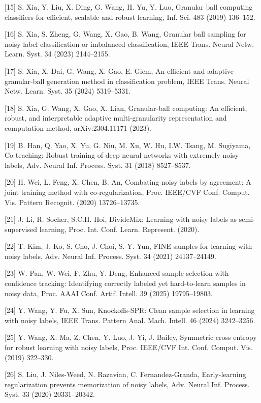 {[}15{]} S. Xia, Y. Liu, X. Ding, G. Wang, H. Yu, Y. Luo, Granular ball computing classifiers for efficient, scalable and robust learning, Inf. Sci. 483 (2019) 136--152.

{[}16{]} S. Xia, S. Zheng, G. Wang, X. Gao, B. Wang, Granular ball sampling for noisy label classification or imbalanced classification, IEEE Trans. Neural Netw. Learn. Syst. 34 (2023) 2144--2155.

{[}17{]} S. Xia, X. Dai, G. Wang, X. Gao, E. Giem, An efficient and adaptive granular-ball generation method in classification problem, IEEE Trans. Neural Netw. Learn. Syst. 35 (2024) 5319--5331.

{[}18{]} S. Xia, G. Wang, X. Gao, X. Lian, Granular-ball computing: An efficient, robust, and interpretable adaptive multi-granularity representation and computation method, arXiv:2304.11171 (2023).

{[}19{]} B. Han, Q. Yao, X. Yu, G. Niu, M. Xu, W. Hu, I.W. Tsang, M. Sugiyama, Co-teaching: Robust training of deep neural networks with extremely noisy labels, Adv. Neural Inf. Process. Syst. 31 (2018) 8527--8537.

{[}20{]} H. Wei, L. Feng, X. Chen, B. An, Combating noisy labels by agreement: A joint training method with co-regularization, Proc. IEEE/CVF Conf. Comput. Vis. Pattern Recognit. (2020) 13726--13735.

{[}21{]} J. Li, R. Socher, S.C.H. Hoi, DivideMix: Learning with noisy labels as semi-supervised learning, Proc. Int. Conf. Learn. Represent. (2020).

{[}22{]} T. Kim, J. Ko, S. Cho, J. Choi, S.-Y. Yun, FINE samples for learning with noisy labels, Adv. Neural Inf. Process. Syst. 34 (2021) 24137--24149.

{[}23{]} W. Pan, W. Wei, F. Zhu, Y. Deng, Enhanced sample selection with confidence tracking: Identifying correctly labeled yet hard-to-learn samples in noisy data, Proc. AAAI Conf. Artif. Intell. 39 (2025) 19795--19803.

{[}24{]} Y. Wang, Y. Fu, X. Sun, Knockoffs-SPR: Clean sample selection in learning with noisy labels, IEEE Trans. Pattern Anal. Mach. Intell. 46 (2024) 3242--3256.

{[}25{]} Y. Wang, X. Ma, Z. Chen, Y. Luo, J. Yi, J. Bailey, Symmetric cross entropy for robust learning with noisy labels, Proc. IEEE/CVF Int. Conf. Comput. Vis. (2019) 322--330.

{[}26{]} S. Liu, J. Niles-Weed, N. Razavian, C. Fernandez-Granda, Early-learning regularization prevents memorization of noisy labels, Adv. Neural Inf. Process. Syst. 33 (2020) 20331--20342.


